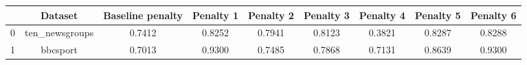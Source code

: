 \begin{tabular}{|l|c|c|c|c|c|c|c|c|}
\hline
 & Dataset & Baseline penalty & Penalty 1 & Penalty 2 & Penalty 3 & Penalty 4 & Penalty 5 & Penalty 6 \\
\hline
0 & ten_newsgroups & 0.7412 & 0.8252 & 0.7941 & 0.8123 & 0.3821 & 0.8287 & 0.8288 \\
1 & bbcsport & 0.7013 & 0.9300 & 0.7485 & 0.7868 & 0.7131 & 0.8639 & 0.9300 \\
\hline
\end{tabular}
